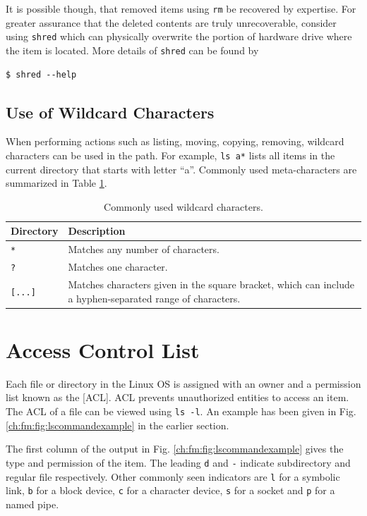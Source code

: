 It is possible though, that removed items using \verb|rm| be recovered by expertise. For greater assurance that the deleted contents are truly unrecoverable, consider using \verb|shred| which can physically overwrite the portion of hardware drive where the item is located. More details of \verb|shred| can be found by
\begin{lstlisting}
$ shred --help
\end{lstlisting}

\subsection{Use of Wildcard Characters}

When performing actions such as listing, moving, copying, removing, wildcard characters can be used in the path. For example, \verb|ls a*| lists all items in the current directory that starts with letter ``a''. Commonly used meta-characters are summarized in Table \ref{ch:fm:tab:metacharacters}.

\begin{table}
  \centering \caption{Commonly used wildcard characters.}\label{ch:fm:tab:metacharacters}
  \begin{tabularx}{\textwidth}{lX}
    \hline
    Directory & Description \\ \hline
    \verb|*| & Matches any number of characters. \\ 
    \verb|?| & Matches one character. \\ 
    \verb|[...]| & Matches characters given in the square bracket, which can include a hyphen-separated range of characters. \\
    \hline
  \end{tabularx}
\end{table}

\section{Access Control List} \label{ch:fm:sec:accesscontrollist}

Each file or directory in the Linux OS is assigned with an owner and a permission list known as the [ACL]. ACL prevents unauthorized entities to access an item. The ACL of a file can be viewed using \verb|ls -l|. An example has been given in Fig. \ref{ch:fm:fig:lscommandexample} in the earlier section.

The first column of the output in Fig. \ref{ch:fm:fig:lscommandexample} gives the type and permission of the item. The leading \verb|d| and \verb|-| indicate subdirectory and regular file respectively. Other commonly seen indicators are \verb|l| for a symbolic link, \verb|b| for a block device, \verb|c| for a character device, \verb|s| for a socket and \verb|p| for a named pipe.

